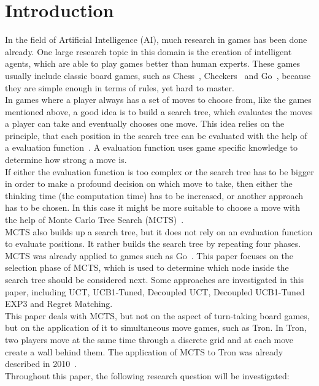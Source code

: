 \documentclass{article}
\begin{document}
\section{Introduction}
\label{sec:introduction}
In the field of Artificial Intelligence (AI), much research in games has been done already. One large research topic in this domain is the creation of intelligent agents, which are able to play games better than human experts. These games usually include classic board games, such as Chess~\cite{deep_blue}, Checkers~\cite{schaeffer_2009} and Go~\cite{computer_go}, because they are simple enough in terms of rules, yet hard to master.\\
In games where a player always has a set of moves to choose from, like the games mentioned above, a good idea is to build a search tree, which evaluates the moves a player can take and eventually chooses one move. This idea relies on the principle, that each position in the search tree can be evaluated with the help of a evaluation function~\cite{ai_russel_norvig}. A evaluation function uses game specific knowledge to determine how strong a move is.\\  
If either the evaluation function is too complex or the search tree has to be bigger in order to make a profound decision on which move to take, then either the thinking time (the computation time) has to be increased, or another approach has to be chosen. In this case it might be more suitable to choose a move with the help of Monte Carlo Tree Search (MCTS)~\cite{chaslot_phd,coulom,kocsis}.\\
MCTS also builds up a search tree, but it does not rely on an evaluation function to evaluate positions. It rather builds the search tree by repeating four phases. MCTS was already applied to games such as Go~\cite{coulom}. This paper focuses on the selection phase of MCTS, which is used to determine which node inside the search tree should be considered next. Some approaches are investigated in this paper, including UCT, UCB1-Tuned, Decoupled UCT, Decoupled UCB1-Tuned EXP3 and Regret Matching.\\
This paper deals with MCTS, but not on the aspect of turn-taking board games, but on the application of it to simultaneous move games, such as Tron. In Tron, two players move at the same time through a discrete grid and at each move create a wall behind them. The application of MCTS to Tron was already described in 2010~\cite{tron_cig}.\\
Throughout this paper, the following research question will be investigated:
\end{document}
